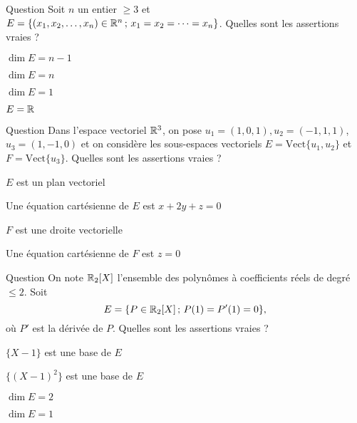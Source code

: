 \begin{multi}[multiple,feedback=
{On a : \(E=\mbox{Vect}\{v\}\), où \( v=(1,1, \dots ,1)\). Par conséquent, \(E\) est un espace vectoriel de dimension \(1\).
}]{Question}
Soit \(n\) un entier \(\ge 3\) et \(E=\{(x_1,x_2, \dots , x_n) \in \mathbb{R}^n \, ; \, x_1=x_2=\dots =x_n\}\). Quelles sont les assertions vraies ?

    \item \(\dim E = n-1\)
    \item \(\dim E = n\)
    \item* \(\dim E = 1\)
    \item \(E=\mathbb{R}\)
\end{multi}


\begin{multi}[multiple,feedback=
{\(E\) est un plan vectoriel.  
Soit \(M(x,y,z)\) un vecteur de \(\Rr^3\). \(M \in E\) si et seulement s'il existe \(a,b \in \Rr\) tels que \(M=au_1+bu_2\). En résolvant ce système, on obtient une équation cartésienne de \(E\) : \(x+2y-z=0\).
\vskip2mm
\(F\) est une droite vectorielle ; c'est donc l'intersection de deux plans de \(\Rr^3\). Soit \(M(x,y,z)\) un vecteur de \(\Rr^3\). \(M \in F\) si et seulement s'il existe un réel \(a\) tels que \(M=au_3\). En 
résolvant ce système, on obtient une représentation cartésienne de \(F\) : \((\mathtt{S}) 
\left\{\begin{array}{rcc}x+y&=&0\\
z&=&0.\end{array}\right.\)
}]{Question}
Dans l'espace vectoriel \(\Rr^3\), on pose \(u_1=(1,0,1), u_2=(-1,1,1)\), \(u_3=(1,-1,0)\) et on considère les sous-espaces vectoriels \(E=\mbox {Vect}\{u_1,u_2\}\) et \(F=\mbox {Vect}\{u_3\}\). Quelles sont les assertions vraies ?

    \item* \(E\) est un plan vectoriel
    \item Une équation cartésienne de \(E\) est \(x+2y+z=0\)
    \item* \(F\) est une droite vectorielle
    \item Une équation cartésienne de \(F\) est \(z=0\)
\end{multi}


\begin{multi}[multiple,feedback=
{\(E=\{aX^2+bX+c \; , \, a,b \in \Rr \; ; \; a+b+c=2a+b=0\} =\mbox {Vect}\{X^2-2X+1\}\). Donc \(\{(X-1)^2\} \) est une base de \(E\) et \(\dim E = 1\).
}]{Question}
On note \(\mathbb{R}_2[X]\) l'ensemble des polynômes à coefficients réels de degré \(\le 2\). Soit 
\[E=\{P \in \mathbb{R}_2[X] \, ; \, P(1)=P'(1)=0\},\]
où \(P'\) est la dérivée de \(P\). Quelles sont les assertions vraies ?

    \item \(\{X-1 \} \) est une base de \(E\)
    \item* \(\{(X-1)^2\} \) est une base de \(E\)
    \item \(\dim E = 2\)
    \item* \(\dim E = 1\)
\end{multi}


